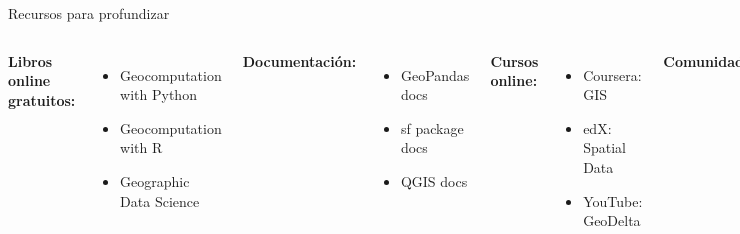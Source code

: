 \documentclass[10pt]{beamer}
\begin{document}
\begin{frame}{Recursos para profundizar}
    \begin{columns}
        \textbf{Libros online gratuitos:}
        \begin{itemize}
            \item Geocomputation with Python
            \item Geocomputation with R
            \item Geographic Data Science
        \end{itemize}
        
        \vspace{0.3cm}
        \textbf{Documentación:}
        \begin{itemize}
            \item GeoPandas docs
            \item sf package docs
            \item QGIS docs
        \end{itemize}
        
        \textbf{Cursos online:}
        \begin{itemize}
            \item Coursera: GIS
            \item edX: Spatial Data
            \item YouTube: GeoDelta
        \end{itemize}
        
        \vspace{0.3cm}
        \textbf{Comunidades:}
        \begin{itemize}
            \item Stack Overflow GIS
            \item r/gis
            \item \#gischat
        \end{itemize}
    \end{columns}
\end{frame}
\end{document}

